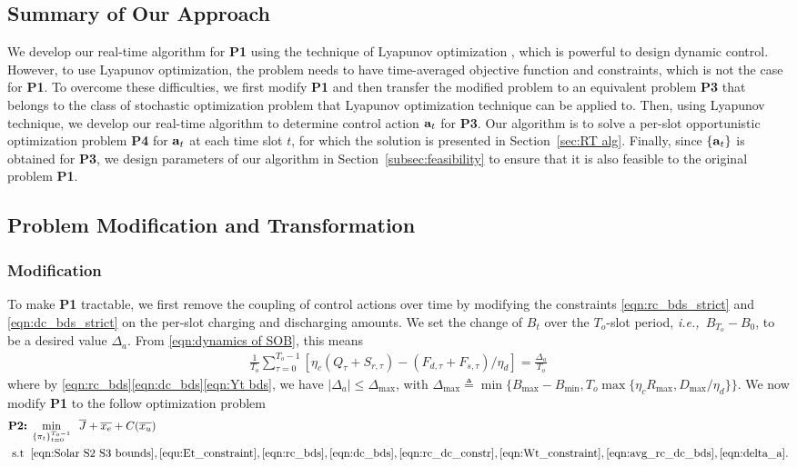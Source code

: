\documentclass[journal]{IEEEtran}
\def\abf{{\bf a}}
\def\ie{{\it i.e.,\ \/}}
\def\nn{\nonumber}
\begin{document}
\subsection{Summary of Our Approach}
We develop  our real-time algorithm for {\bf P1} using    the technique of Lyapunov optimization \cite{book:Neely}, which is powerful to design dynamic control. However, to use Lyapunov optimization, the problem needs to have time-averaged objective function and constraints, which is not the case for {\bf P1}. To overcome these difficulties, we first modify {\bf P1} and then transfer the modified problem to an equivalent problem {\bf P3} that belongs to the class of stochastic optimization problem that Lyapunov optimization technique can be applied to. Then, using Lyapunov technique, we develop our real-time algorithm to determine control action $\abf_t$ for {\bf P3}. Our algorithm is to solve a per-slot opportunistic optimization problem {\bf P4} for $\abf_t$ at each time slot $t$, for which the  solution is presented in Section~\ref{sec:RT alg}. Finally, since $\{\abf_t\}$ is obtained for {\bf P3}, we design parameters of our algorithm in Section~\ref{subsec:feasibility} to ensure that it is also feasible to the original problem {\bf P1}.



\subsection{Problem Modification and Transformation}
\subsubsection{Modification}
To make {\bf P1} tractable, we first  remove the coupling of control actions over time by modifying the constraints  \eqref{eqn:rc_bds_strict} and \eqref{eqn:dc_bds_strict} on the per-slot charging and discharging amounts. We set the  change of $B_t$ over the $T_o$-slot period, \ie $B_{T_o}-B_0$, to be a desired value $\Delta_a$. From \eqref{eqn:dynamics of SOB}, this means
\begin{align}
\label{eqn:delta_a}
\frac{1}{T_o}\sum_{\tau=0}^{T_o-1}\left[\eta_c(Q_\tau+S_{r,\tau})-(F_{d,\tau}+F_{s,\tau})/\eta_d\right]=\frac{\Delta_a}{T_o}
\end{align}
where by \eqref{eqn:rc_bds}\eqref{eqn:dc_bds}\eqref{eqn:Yt bds}, we have $|\Delta_a|\leq\Delta_{\max}$, with $\Delta_{\max} \triangleq \min\{B_{\max}-B_{\min}, T_o\max\{\eta_cR_{\max},D_{\max}/\eta_d\}\}$. We now modify {\bf P1} to the follow optimization problem
\begin{align}
\textrm{\bf P2:}\; &\min_{\{\pi_t\}_{t=0}^{T_o-1}} \;\;%
\overline{J}+\overline{x_e}+C(\overline{x_u})\nn\\
\rm{s.t} \;\;
&\eqref{eqn:Solar S2 S3 bounds},\eqref{equ:Et_constraint},\eqref{eqn:rc_bds}, \eqref{eqn:dc_bds}, \eqref{eqn:rc_dc_constr},\eqref{eqn:Wt_constraint},\eqref{eqn:avg_rc_dc_bds},\eqref{eqn:delta_a}.\nn
\end{align}
\end{document}
